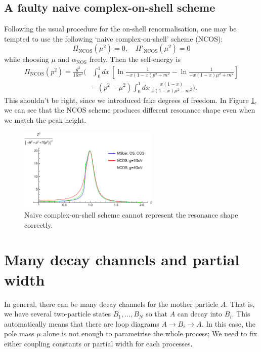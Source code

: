\documentclass[11pt]{article}
\theoremstyle{definition}
\theoremstyle{remark}
\begin{document}
	\subsection{A faulty naive complex-on-shell scheme}
	Following the usual procedure for the on-shell renormalisation, one may be tempted to use the following `naive complex-on-shell' scheme ($\mathrm{NCOS}$):
	\[\Pi_{\mathrm{NCOS}}(\mu^{2})=0,\quad\Pi'_{\mathrm{NCOS}}(\mu^{2})=0\]
	while choosing $\mu$ and $\alpha_{\mathrm{NOS}}$ freely.
	Then the self-energy is
	\begin{align*}
		\Pi_{\mathrm{NCOS}}(p^{2})=\frac{g^{2}}{16\pi^{2}}\bigg(&\int_{0}^{1}dx\,\left[\ln\frac{1}{-x(1-x)p^{2}+m^{2}}-\ln\frac{1}{-x(1-x)\mu^{2}+m^{2}}\right]\\
		&-(p^{2}-\mu^{2})\int_{0}^{1}dx\,\frac{x(1-x)}{x(1-x)\mu^{2}-m^{2}}\bigg).
	\end{align*}
	This shouldn't be right, since we introduced fake degrees of freedom.
	In Figure \ref{fig:NCOS}, we can see that the $\mathrm{NCOS}$ scheme produces different resonance shape even when we match the peak height.
	
	\begin{figure}[h]
		\centering
		\includegraphics[width=0.6\textwidth]{olsi3.pdf}
		\caption{Naive complex-on-shell scheme cannot represent the resonance shape correctly.}
		\label{fig:NCOS}
	\end{figure}
	
	\section{Many decay channels and partial width}
	In general, there can be many decay channels for the mother particle $A$.
	That is, we have several two-particle states $B_{1},\dots,B_{N}$ so that $A$ can decay into $B_{i}$.
	This automatically means that there are loop diagrams $A\to B_{i}\to A$.
	In this case, the pole mass $\mu$ alone is not enough to parametrise the whole process;
	We need to fix either coupling constants or partial width for each processes.
	
\end{document}
